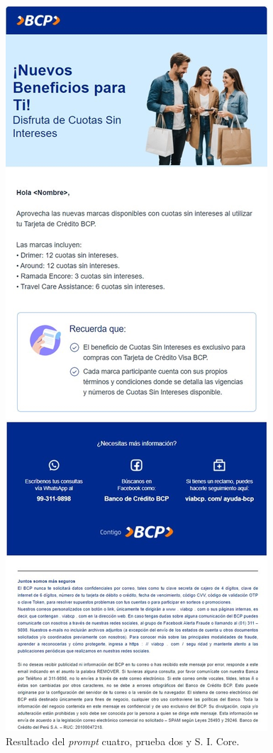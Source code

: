 \begin{figure}[H]
    \centering
    \includegraphics[width=0.6\linewidth]{Figures/Prueba_4_2_core.JPG}
    \caption{Resultado del \textit{prompt} cuatro, prueba dos y S. I. Core.}
    \label{fig:prueba_4_2}
\end{figure}

